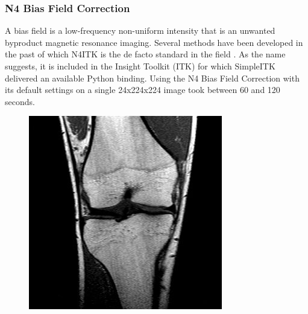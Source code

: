 \subsubsection{N4 Bias Field Correction}

A bias field is a low-frequency non-uniform intensity that is an unwanted byproduct magnetic resonance imaging. Several methods have been developed in the past of which N4ITK is the de facto standard in the field \cite{Tustison2010}. As the name suggests, it is included in the Insight Toolkit (ITK) for which SimpleITK delivered an available Python binding. Using the N4 Bias Field Correction with its default settings on a single 24x224x224 image took between 60 and 120 seconds.

\begin{figure}[H]
  \includegraphics[width=\linewidth]{imgs/orig.jpg}
\endminipage\hfill
{}

\end{figure}
